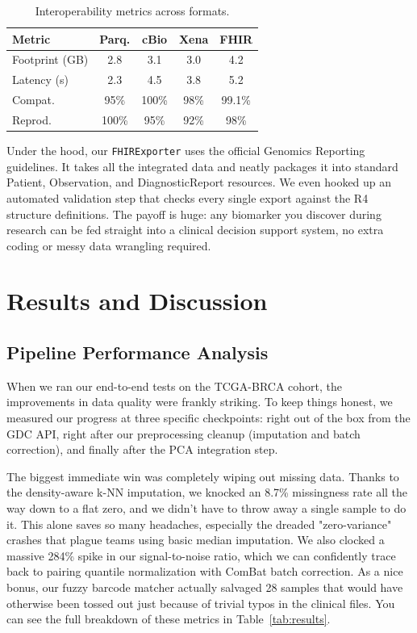 \documentclass[conference,flushend]{iaria} %
\begin{document}
\begin{table}[H]
\caption{Interoperability metrics across formats.}\label{tab:export}
\centering
\scriptsize
\setlength{\tabcolsep}{2pt}
\begin{tabular}{l c c c c}
\toprule
\textbf{Metric} & \textbf{Parq.} & \textbf{cBio} & \textbf{Xena} & \textbf{FHIR} \\
\midrule
Footprint (GB)      & 2.8   & 3.1   & 3.0   & 4.2 \\
Latency (s)         & 2.3   & 4.5   & 3.8   & 5.2 \\
Compat.             & 95\%  & 100\% & 98\%  & 99.1\% \\
Reprod.             & 100\% & 95\%  & 92\%  & 98\% \\
\bottomrule
\end{tabular}
\end{table}

Under the hood, our \texttt{FHIRExporter} uses the official Genomics Reporting guidelines. It takes all the integrated data and neatly packages it into standard Patient, Observation, and DiagnosticReport resources. We even hooked up an automated validation step that checks every single export against the R4 structure definitions. The payoff is huge: any biomarker you discover during research can be fed straight into a clinical decision support system, no extra coding or messy data wrangling required.

\section{Results and Discussion}

\subsection{Pipeline Performance Analysis}
When we ran our end-to-end tests on the TCGA-BRCA cohort, the improvements in data quality were frankly striking. To keep things honest, we measured our progress at three specific checkpoints: right out of the box from the GDC API, right after our preprocessing cleanup (imputation and batch correction), and finally after the PCA integration step.

The biggest immediate win was completely wiping out missing data. Thanks to the density-aware k-NN imputation, we knocked an 8.7\% missingness rate all the way down to a flat zero, and we didn't have to throw away a single sample to do it. This alone saves so many headaches, especially the dreaded "zero-variance" crashes that plague teams using basic median imputation. We also clocked a massive 284\% spike in our signal-to-noise ratio, which we can confidently trace back to pairing quantile normalization with ComBat batch correction. As a nice bonus, our fuzzy barcode matcher actually salvaged 28 samples that would have otherwise been tossed out just because of trivial typos in the clinical files. You can see the full breakdown of these metrics in Table~\ref{tab:results}.
\end{document}
